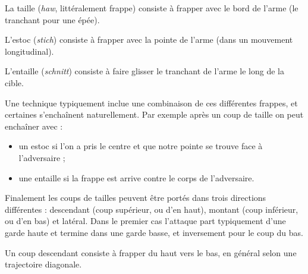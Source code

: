 \begin{coup}[Taille]

La taille (\emph{haw}, littéralement frappe) consiste à frapper avec le bord de l'arme (le tranchant pour une épée).

\end{coup}


\begin{coup}[Estoc]

L'estoc (\emph{stich}) consiste à frapper avec la pointe de l'arme (dans un mouvement longitudinal).

\end{coup}


\begin{coup}[Entaille]

L'entaille (\emph{schnitt}) consiste à faire glisser le tranchant de l'arme le long de la cible.

\end{coup}


Une technique typiquement inclue une combinaison de ces différentes frappes, et certaines s'enchaînent naturellement.
Par exemple après un coup de taille on peut enchaîner avec :
\begin{itemize}
	\item un estoc si l'on a pris le centre et que notre pointe se trouve face à l'adversaire ;
	\item une entaille si la frappe est arrive contre le corps de l'adversaire.
\end{itemize}


Finalement les coups de tailles peuvent être portés dans trois directions différentes : descendant (coup supérieur, ou d'en haut), montant (coup inférieur, ou d'en bas) et latéral.
Dans le premier cas l'attaque part typiquement d'une garde haute et termine dans une garde basse, et inversement pour le coup du bas.


\begin{coup}
\label{att:coup:descendant}

Un coup descendant consiste à frapper du haut vers le bas, en général selon une trajectoire diagonale.

\end{coup}


